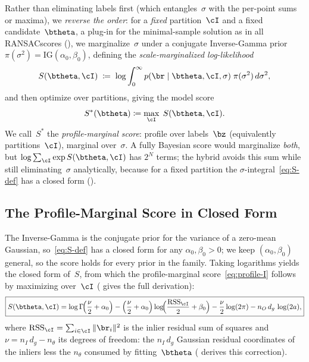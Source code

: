 \documentclass{article}
\DeclareMathOperator{\RSS}{RSS}
\newcommand{\IG}{\mathrm{IG}}
\newcommand{\mname}[1]{\texorpdfstring{#1\xspace}{#1}}
\newcommand{\ransac}{\mname{RANSAC}}
\newcommand{\invgamma}{Inverse-Gamma\xspace}
\begin{document}
Rather than eliminating labels first (which entangles~$\sigma$ with
the per-point sums or maxima), we \emph{reverse the order}: for a
\emph{fixed} partition~$\cI$ and a fixed candidate~$\btheta$, a plug-in
for the minimal-sample solution as in all \ransac scores
(), we marginalize~$\sigma$ under a conjugate
\invgamma prior $\pi(\sigma^2) = \IG(\alpha_0, \beta_0)$, defining the
\emph{scale-marginalized log-likelihood}
\begin{equation}
	S(\btheta, \cI)
	\;\coloneqq\; \log \int_0^\infty
	p(\br \mid \btheta, \cI, \sigma)\;
	\pi(\sigma^2)\, d\sigma^2,
	\label{eq:S-def}
\end{equation}
and then optimize over partitions, giving the model score
\begin{equation}
	S^*(\btheta) \coloneqq \max_{\cI} \; S(\btheta, \cI).
	\label{eq:profile-I}
\end{equation}
We call~$S^*$ the \emph{profile-marginal score}: profile over
labels~$\bz$ (equivalently partitions~$\cI$), marginal
over~$\sigma$.  A fully Bayesian score would marginalize
\emph{both}, but $\log \sum_{\cI} \exp S(\btheta,\cI)$ has $2^N$
terms; the hybrid avoids this sum while still eliminating~$\sigma$
analytically, because for a fixed partition the
$\sigma$-integral~\eqref{eq:S-def} has a closed form
().

\subsection{The Profile-Marginal Score in Closed Form}
\label{sec:score}

The \invgamma is the conjugate prior for the variance of a zero-mean
Gaussian, so~\eqref{eq:S-def} has a closed form for any
$\alpha_0, \beta_0 > 0$; we keep $(\alpha_0, \beta_0)$ general, so the
score holds for every prior in the family.  Taking logarithms yields
the closed form of~$S$, from which the profile-marginal
score~\eqref{eq:profile-I} follows by maximizing over~$\cI$
( gives the full derivation):
\begin{equation}
	\boxed{
		S(\btheta, \cI)
		= \log\Gamma\!\Bigl(\frac{\nu}{2} + \alpha_0\Bigr)
		- \Bigl(\frac{\nu}{2} + \alpha_0\Bigr)
		\log\!\Bigl(\frac{\RSS_\cI}{2} + \beta_0\Bigr)
		- \frac{\nu}{2}\log(2\pi)
		- n_O\, d_g\,\log(2a),
	}
	\label{eq:score}
\end{equation}
where $\RSS_\cI = \sum_{i\in\cI} \|\br_i\|^2$ is the inlier residual
sum of squares and $\nu = n_I\,d_g - n_\theta$ its degrees of freedom:
the $n_I\,d_g$ Gaussian residual coordinates of the inliers less the
$n_\theta$ consumed by fitting~$\btheta$ ( derives
this correction).
\end{document}
